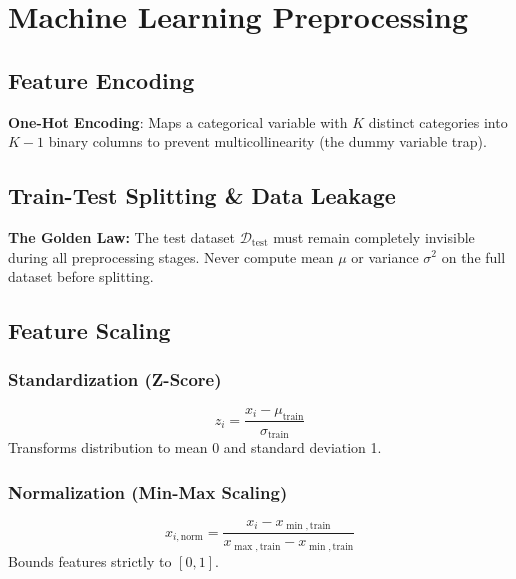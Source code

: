 \documentclass[11pt,a4paper]{article}
\begin{document}
\section{Machine Learning Preprocessing}
\subsection{Feature Encoding}
\textbf{One-Hot Encoding}: Maps a categorical variable with $K$ distinct categories into $K-1$ binary columns to prevent multicollinearity (the dummy variable trap).

\subsection{Train-Test Splitting \& Data Leakage}
\textbf{The Golden Law:} The test dataset $\mathcal{D}_{\text{test}}$ must remain completely invisible during all preprocessing stages. Never compute mean $\mu$ or variance $\sigma^2$ on the full dataset before splitting.

\subsection{Feature Scaling}
\subsubsection{Standardization (Z-Score)}
\begin{equation}
z_i = \frac{x_i - \mu_{\text{train}}}{\sigma_{\text{train}}}
\end{equation}
Transforms distribution to mean 0 and standard deviation 1.

\subsubsection{Normalization (Min-Max Scaling)}
\begin{equation}
x_{i,\text{norm}} = \frac{x_i - x_{\min,\text{train}}}{x_{\max,\text{train}} - x_{\min,\text{train}}}
\end{equation}
Bounds features strictly to $[0, 1]$.
\end{document}
